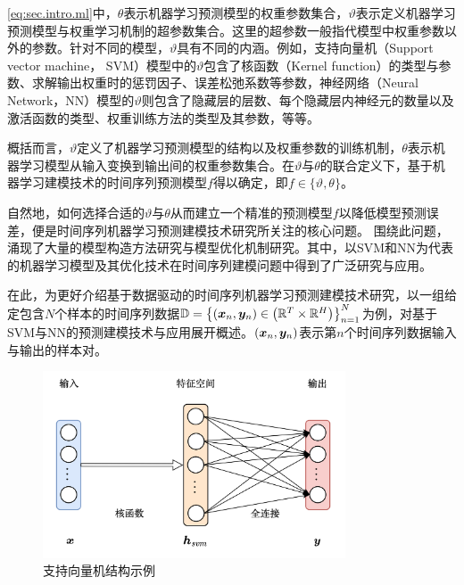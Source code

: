 \autoref{eq:sec.intro.ml}中，\(\theta\)表示机器学习预测模型的权重参数集合，\(\vartheta\)表示定义机器学习预测模型与权重学习机制的超参数集合。这里的超参数一般指代模型中权重参数以外的参数。针对不同的模型，\(\vartheta\)具有不同的内涵。例如，支持向量机（Support vector machine， SVM）模型中的\(\vartheta\)包含了核函数（Kernel function）的类型与参数、求解输出权重时的惩罚因子、误差松弛系数等参数，神经网络（Neural Network，NN）模型的\(\vartheta\)则包含了隐藏层的层数、每个隐藏层内神经元的数量以及激活函数的类型、权重训练方法的类型及其参数，等等。

概括而言，\(\vartheta\)定义了机器学习预测模型的结构以及权重参数的训练机制，\(\theta\)表示机器学习模型从输入变换到输出间的权重参数集合。在\(\vartheta\)与\(\theta\)的联合定义下，基于机器学习建模技术的时间序列预测模型\(f\)得以确定，即\(f \in \{\vartheta, \theta\}\)。

自然地，如何选择合适的\(\vartheta\)与\(\theta\)从而建立一个精准的预测模型\(f\)以降低模型预测误差，便是时间序列机器学习预测建模技术研究所关注的核心问题。
围绕此问题，涌现了大量的模型构造方法研究与模型优化机制研究。其中，以SVM和NN为代表的机器学习模型及其优化技术在时间序列建模问题中得到了广泛研究与应用。

在此，为更好介绍基于数据驱动的时间序列机器学习预测建模技术研究，以一组给定包含\(N\)个样本的时间序列数据\(\mathbb{D} = \left\{\left(\bm{x}_{n}, \bm{y}_{n}\right) \in\left(\mathbb{R}^{T} \times \mathbb{R}^{H}\right)\right\}_{n=1}^{N}\)为例，对基于SVM与NN的预测建模技术与应用展开概述。\(\left(\bm{x}_{n}, \bm{y}_{n}\right) \)表示第\(n\)个时间序列数据输入与输出的样本对。


\begin{figure}[t!]
    \centering
    \includegraphics[width=0.8\textwidth]{float/ch.intro/svm.png}
    \caption{支持向量机结构示例\label{fig:ch.intro.svm}}
\end{figure}

